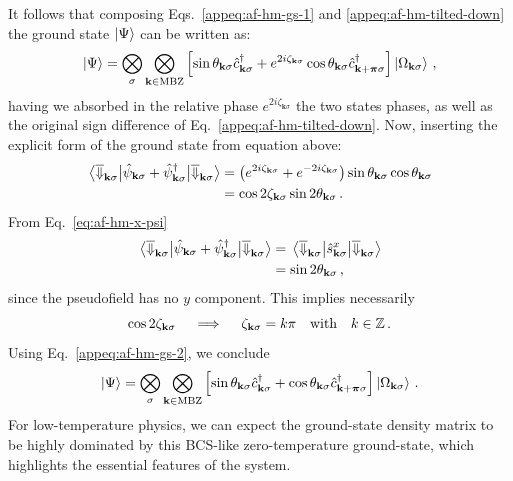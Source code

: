 It follows that composing Eqs.~\eqref{appeq:af-hm-gs-1} and \eqref{appeq:af-hm-tilted-down} the ground state $\ket{\Psi}$ can be written as:
\begin{equation}\label{appeq:af-hm-gs-2}
	\ket{\Psi} = \bigotimes_\sigma \bigotimes_{\mathbf{k}\in\mathrm{MBZ}} \left[
	\sin\theta_{\mathbf{k}\sigma} \hat c_{\mathbf{k}\sigma}^\dagger + e^{2i\zeta_{\mathbf{k}\sigma}} \cos \theta_{\mathbf{k}\sigma} \hat c_{\mathbf{k}+\bm{\pi}\sigma}^\dagger
	\right] \ket{\Omega_{\mathbf{k}\sigma}} \, ,
\end{equation}
having we absorbed in the relative phase $e^{2i\zeta_{\mathbf{k}\sigma}}$ the two states phases, as well as the original sign difference of Eq.~\eqref{appeq:af-hm-tilted-down}. Now, inserting the explicit form of the ground state from equation above:
\[
\begin{aligned}
	\mel{\overline{\Downarrow}_{\mathbf{k}\sigma}}{\hat \psi_{\mathbf{k}\sigma} + \hat \psi_{\mathbf{k}\sigma}^\dagger}{\overline{\Downarrow}_{\mathbf{k}\sigma}} &= \left(e^{2i\zeta_{\mathbf{k}\sigma}} + e^{-2i\zeta_{\mathbf{k}\sigma}}\right) \sin\theta_{\mathbf{k}\sigma} \cos\theta_{\mathbf{k}\sigma} \\
	&= \cos 2\zeta_{\mathbf{k}\sigma} \sin 2\theta_{\mathbf{k}\sigma} \, .
\end{aligned}
\]
From Eq.~\eqref{eq:af-hm-x-psi}
\[
\begin{aligned}
	\mel{\overline{\Downarrow}_{\mathbf{k}\sigma}}{\hat \psi_{\mathbf{k}\sigma} + \hat \psi_{\mathbf{k}\sigma}^\dagger}{\overline{\Downarrow}_{\mathbf{k}\sigma}} &= 	\mel{\overline{\Downarrow}_{\mathbf{k}\sigma}}{\hat s_{\mathbf{k}\sigma}^x}{\overline{\Downarrow}_{\mathbf{k}\sigma}} \\
	&= \sin 2\theta_{\mathbf{k}\sigma} \, ,
\end{aligned}
\]
since the pseudofield has no $y$ component. This implies necessarily
\[
	\cos 2\zeta_{\mathbf{k}\sigma}
	\quad\implies\quad
	\zeta_{\mathbf{k}\sigma} = k\pi
	\qq{with}
	k\in\mathbb{Z} \, .
\]
Using Eq.~\eqref{appeq:af-hm-gs-2}, we conclude
\begin{equation}\label{appeq:af-hm-gs-3}
	\ket{\Psi} = \bigotimes_\sigma \bigotimes_{\mathbf{k}\in\mathrm{MBZ}} \left[
	\sin \theta_{\mathbf{k}\sigma} \hat c_{\mathbf{k}\sigma}^\dagger + \cos \theta_{\mathbf{k}\sigma} \hat c_{\mathbf{k}+\bm{\pi}\sigma}^\dagger
	\right] \ket{\Omega_{\mathbf{k}\sigma}} \, .
\end{equation}
For low-temperature physics, we can expect the ground-state density matrix to be highly dominated by this BCS-like zero-temperature ground-state, which highlights the essential features of the system. 

